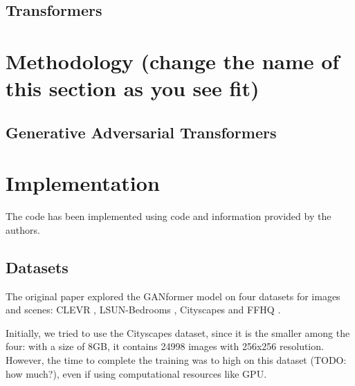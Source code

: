 \documentclass{article}
\begin{document}
	\subsection{Transformers}
	
	\section{Methodology (change the name of this section as you see fit)}
	
	
	\subsection{Generative Adversarial Transformers}
	
	\section{Implementation}
%	
%	
%	
%	
	The code has been implemented using code and information provided by the authors.
	
	\subsection{Datasets}
	
	The original paper \cite{hudson2021generative} explored the GANformer model on four datasets for 
	images and scenes: CLEVR \cite{johnson2017clevr}, LSUN-Bedrooms \cite{yu2015lsun}, Cityscapes 
	\cite{cordts2016cityscapes} and FFHQ \cite{karras2019style}. 
	
	Initially, we tried to use the Cityscapes dataset, since it is the smaller among the four: with a size of 
	8GB, it contains 24998 images with 256x256 resolution. 
	However, the time to complete the training was to high on this dataset (TODO: how much?), even if 
	using computational resources like GPU.
	
\end{document}
